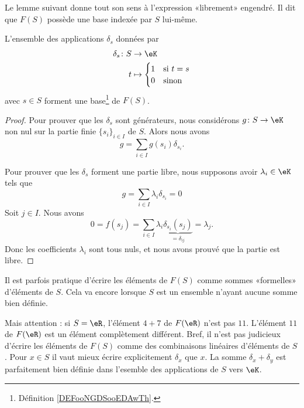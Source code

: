 Le lemme suivant donne tout son sens à l'expression «librement» engendré. Il dit que \( F(S)\) possède une base indexée par \( S\) lui-même.
\begin{lemma}       \label{LEMooLOPAooUNQVku}
    L'ensemble des applications \( \delta_s\) données par
    \begin{equation}
        \begin{aligned}
            \delta_s\colon S&\to \eK \\
            t&\mapsto \begin{cases}
                1    &   \text{si } t=s\\
                0    &    \text{sinon }
            \end{cases}
        \end{aligned}
    \end{equation}
    avec \( s\in S\) forment une base\footnote{Définition \ref{DEFooNGDSooEDAwTh}.} de \( F(S)\).
\end{lemma}

\begin{proof}
    Pour prouver que les \( \delta_s\) sont générateurs, nous considérons \( g\colon S\to \eK\) non nul sur la partie finie \( \{ s_i \}_{i\in I}\) de \( S\). Alors nous avons
    \begin{equation}
        g=\sum_{i\in I}g(s_i)\delta_{s_i}.
    \end{equation}
    
    Pour prouver que les \( \delta_s\) forment une partie libre, nous supposons avoir \( \lambda_i\in \eK\) tels que
    \begin{equation}
        g=\sum_{i\in I}\lambda_i\delta_{s_i}=0
    \end{equation}
    Soit \( j\in I\). Nous avons
    \begin{equation}
        0=f(s_j)=\sum_{i\in I}\lambda_i \underbrace{\delta_{s_i}(s_j)}_{=\delta_{ij}}=\lambda_j.
    \end{equation}
    Donc les coefficients \( \lambda_i\) sont tous nuls, et nous avons prouvé que la partie est libre.
\end{proof}

Il est parfois pratique d'écrire les éléments de \( F(S)\) comme sommes «formelles» d'éléments de \( S\). Cela va encore lorsque \( S\) est un ensemble n'ayant aucune somme bien définie. 

Mais attention : si \( S=\eR\), l'élément \( 4+7\) de \( F(\eR)\) n'est pas \( 11\). L'élément \( 11\) de \( F(\eR)\) est un élément complètement différent. Bref, il n'est pas judicieux d'écrire les éléments de \( F(S)\) comme des combinaisons linéaires d'éléments de \( S\). Pour \( x\in S\) il vaut mieux écrire explicitement \( \delta_x\) que \( x\). La somme \( \delta_x+\delta_y\) est parfaitement bien définie dans l'esemble des applications de \( S\) vers \( \eK\).

